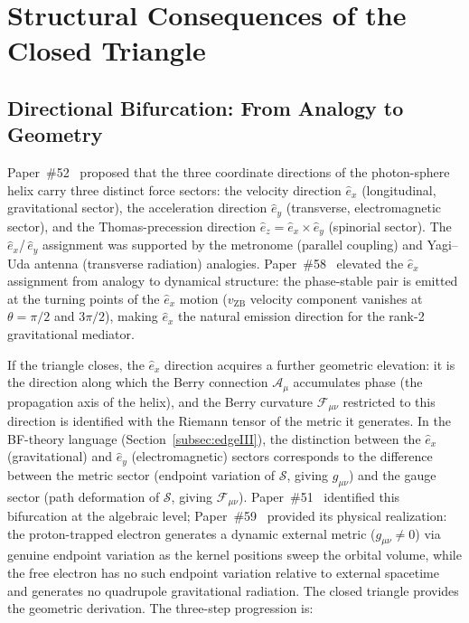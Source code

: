 \documentclass[%
 reprint, amsmath,amssymb, aps, prd, ]{revtex4-2}
\numberwithin{equation}{section}
\newcommand{\iphase}{\theta}
\newcommand{\vZB}{v_{\mathrm{ZB}}}
\newcommand{\ehat}[1]{\hat{e}_{#1}}
\newcommand{\BerryA}{\mathcal{A}}
\newcommand{\BerryF}{\mathcal{F}}
\newcommand{\SyngeS}{\mathcal{S}}
\begin{document}
\section{Structural Consequences of the Closed Triangle}
\label{sec:consequences}

\subsection{Directional Bifurcation: From Analogy to Geometry}

Paper~\#52~\cite{hanamura52} proposed that the three coordinate directions of the photon-sphere helix carry three distinct force sectors: the velocity direction $\ehat{x}$ (longitudinal, gravitational sector), the acceleration direction $\ehat{y}$ (transverse, electromagnetic sector), and the Thomas-precession direction $\ehat{z} = \ehat{x}\times\ehat{y}$ (spinorial sector).
The $\ehat{x}$/\,$\ehat{y}$ assignment was supported by the metronome (parallel coupling) and Yagi--Uda antenna (transverse radiation) analogies.
Paper~\#58~\cite{hanamura58} elevated the $\ehat{x}$ assignment from analogy to dynamical structure: the phase-stable pair is emitted at the turning points of the $\ehat{x}$ motion ($\vZB$ velocity component vanishes at $\iphase = \pi/2$ and $3\pi/2$), making $\ehat{x}$ the natural emission direction for the rank-2 gravitational mediator.

If the triangle closes, the $\ehat{x}$ direction acquires a further geometric elevation: it is the direction along which the Berry connection $\BerryA_\mu$ accumulates phase (the propagation axis of the helix), and the Berry curvature $\BerryF_{\mu\nu}$ restricted to this direction is identified with the Riemann tensor of the metric it generates.
In the BF-theory language (Section~\ref{subsec:edgeIII}), the distinction between the $\ehat{x}$ (gravitational) and $\ehat{y}$ (electromagnetic) sectors corresponds to the difference between the metric sector (endpoint variation of $\SyngeS$, giving $g_{\mu\nu}$) and the gauge sector (path deformation of $\SyngeS$, giving $\BerryF_{\mu\nu}$).
Paper~\#51~\cite{hanamura51} identified this bifurcation at the algebraic level; Paper~\#59~\cite{hanamura59} provided its physical realization: the proton-trapped electron generates a dynamic external metric ($g_{\mu\nu} \neq 0$) via genuine endpoint variation as the kernel positions sweep the orbital volume, while the free electron has no such endpoint variation relative to external spacetime and generates no quadrupole gravitational radiation.
The closed triangle provides the geometric derivation.
The three-step progression is:
\end{document}
